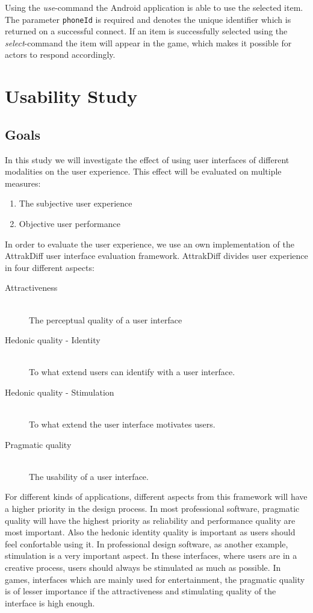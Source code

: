 \documentclass[a4paper,10pt]{report}
\begin{document}
		\noindent Using the \emph{use}-command the Android application is able to use the selected item.
		The parameter \texttt{phoneId} is required and denotes the unique identifier which is returned on a successful connect.
		If an item is successfully selected using the \emph{select}-command the item will appear in the game, which makes it possible for actors to respond accordingly.

\chapter{Usability Study}
\label{chap:usabilitystudy}

\section{Goals}
In this study we will investigate the effect of using user interfaces of different modalities on the user experience.
This effect will be evaluated on multiple measures: 
\begin{enumerate}
\item The subjective user experience
\item Objective user performance
\end{enumerate}
In order to evaluate the user experience, we use an own implementation of the AttrakDiff user interface evaluation framework.
AttrakDiff divides user experience in four different aspects: 
\begin{description}
  \item [Attractiveness] \vline \\ The perceptual quality of a user interface
  \item [Hedonic quality - Identity] \vline \\ To what extend users can identify with a user interface.
  \item [Hedonic quality - Stimulation] \vline \\ To what extend the user interface motivates users.
  \item [Pragmatic quality] \vline \\ The usability of a user interface.
 \end{description} 
For different kinds of applications, different aspects from this framework will have a higher priority in the design process.
In most professional software, pragmatic quality will have the highest priority as reliability and performance quality are most important.
Also the hedonic identity quality is important as users should feel confortable using it.
In professional design software, as another example, stimulation is a very important aspect.
In these interfaces, where users are in a creative process, users should always be stimulated as much as possible.
In games, interfaces which are mainly used for entertainment, the pragmatic quality is of lesser importance if the attractiveness and stimulating quality of the interface is high enough.
 
\end{document}
